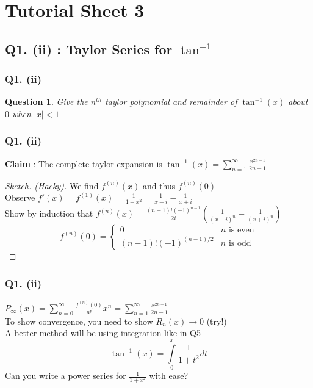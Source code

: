\documentclass[handout,aspectratio=169]{beamer}
\newtheorem{qsn}{Question}
\begin{document}
\section{Tutorial Sheet 3}

\subsection{Q1. (ii) : Taylor Series for $\tan ^{-1}$}

\begin{frame}
\frametitle{Q1. (ii)}
\pause
\begin{qsn}
Give the $n^{th}$ taylor polynomial and remainder of $\tan^{-1}(x)$ about $0$ when $|x|<1$
\end{qsn}
\end{frame}

\begin{frame}
\frametitle{Q1. (ii)}
\textbf{Claim} : The complete taylor expansion is $\tan^{-1}(x) = \sum\limits_{n=1}^\infty \frac{x^{2n-1}}{2n-1}$
\begin{proof}[Sketch. (Hacky)]
We find $f^{(n)}(x)$ and thus $f^{(n)}(0)$ \\ \pause
Observe $f'(x) = f^{(1)}(x) = \frac{1}{1+x^2} = \frac{1}{x-i}-\frac{1}{x+i}$ \\ \pause
Show by induction that $f^{(n)}(x) = \frac{(n-1)!(-1)^{n-1}}{2i} \left(\frac{1}{(x-i)^n} - \frac{1}{(x+i)^n}\right)$ \pause
$$f^{(n)}(0) = \begin{cases}
0 & n \text{ is even}\\
(n-1)!(-1)^{(n-1)/2} & n \text{ is odd}
\end{cases}$$
\end{proof}
\end{frame}

\begin{frame}
\frametitle{Q1. (ii)}
$P_\infty(x) = \sum\limits_{n=0}^{\infty} \frac{f^{(n)}(0)}{n!}x^n = \sum\limits_{n=1}^\infty \frac{x^{2n-1}}{2n-1}$ \\ \pause
To show convergence, you need to show $R_n(x) \to 0$ (try!) \\ \pause
A better method will be using integration like in Q5 \\ \pause
$$\tan^{-1}(x) = \int\limits_0^x \frac{1}{1+t^2}dt$$
Can you write a power series for $\frac{1}{1+x^2}$ with ease?
\end{frame}
\end{document}

